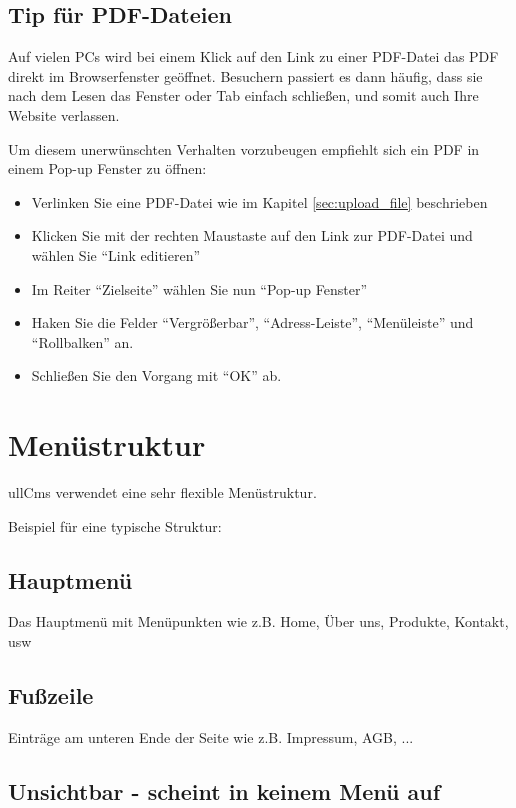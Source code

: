\documentclass[article, a4paper, oneside, 11pt]{memoir}
\begin{document}
\section{Tip für PDF-Dateien}

Auf vielen PCs wird bei einem Klick auf den Link zu einer PDF-Datei das PDF direkt im Browserfenster geöffnet. Besuchern passiert es dann häufig, dass sie nach dem Lesen das Fenster oder Tab einfach schließen, und somit auch Ihre Website verlassen.

Um diesem unerwünschten Verhalten vorzubeugen empfiehlt sich ein PDF in einem Pop-up Fenster zu öffnen:

\begin{itemize}
\item Verlinken Sie eine PDF-Datei wie im Kapitel \vref{sec:upload_file} beschrieben
\item Klicken Sie mit der rechten Maustaste auf den Link zur PDF-Datei und wählen Sie "`Link editieren"'
\item Im Reiter "`Zielseite"' wählen Sie nun "`Pop-up Fenster"'
\item Haken Sie die Felder "`Vergrößerbar"', "`Adress-Leiste"', "`Menüleiste"' und "`Rollbalken"' an.
\item Schließen Sie den Vorgang mit "`OK"' ab.
\end{itemize}

\chapter{Menüstruktur}

ullCms verwendet eine sehr flexible Menüstruktur. 

Beispiel für eine typische Struktur:

\section{Hauptmenü}

Das Hauptmenü mit Menüpunkten wie z.B. Home, Über uns, Produkte, Kontakt, usw


\section{Fußzeile}

Einträge am unteren Ende der Seite wie z.B. Impressum, AGB, ...

\section{Unsichtbar - scheint in keinem Menü auf}
\end{document}
